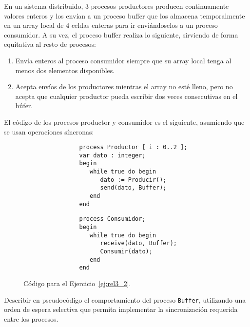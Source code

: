 \begin{ejercicio}\label{ej:rel3_2}
    En un sistema distribuido, 3 procesos productores producen continuamente valores enteros y los envían a un proceso buffer que los almacena temporalmente en un array local de 4 celdas enteras para ir enviándoselos a un proceso consumidor. A su vez, el proceso buffer realiza lo siguiente, sirviendo de forma equitativa al resto de procesos:
    \begin{enumerate}[label=(\alph*)]
        \item Envía enteros al proceso consumidor siempre que su array local tenga al menos dos elementos disponibles.
        \item Acepta envíos de los productores mientras el array no esté lleno, pero no acepta que cualquier productor pueda escribir dos veces consecutivas en el búfer.
    \end{enumerate}
    El código de los procesos productor y consumidor es el siguiente, asumiendo que se usan operaciones síncronas:
    \begin{figure}[H]
        \centering
        \setlength{\columnsep}{1cm}
        \begin{multicols}{2}
            \begin{verbatim}
                process Productor [ i : 0..2 ];
                var dato : integer;
                begin
                   while true do begin
                      dato := Producir();
                      send(dato, Buffer);
                   end
                end
            \end{verbatim}
            \begin{verbatim}
                process Consumidor;
                begin
                   while true do begin
                      receive(dato, Buffer);
                      Consumir(dato);
                   end
                end
            \end{verbatim}
        \end{multicols}
        \caption{Código para el Ejercicio~\ref{ej:rel3_2}.}
        \label{fig:cod_2}
    \end{figure}
    Describir en pseudocódigo el comportamiento del proceso \verb|Buffer|, utilizando una orden de espera selectiva que permita implementar la sincronización requerida entre los procesos.\\


\end{ejercicio}
